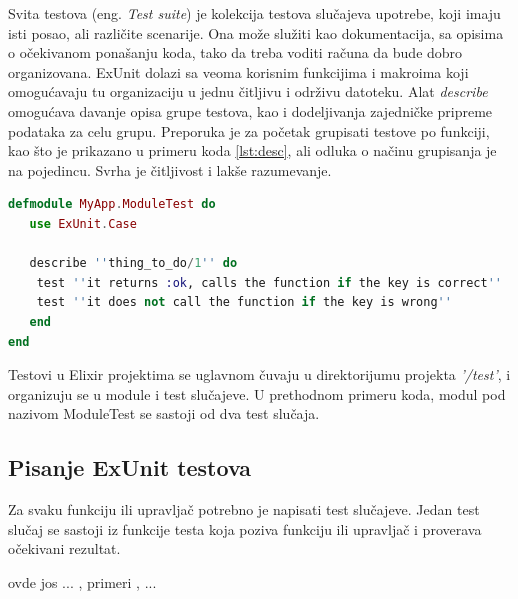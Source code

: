 \documentclass[12pt,oneside]{memoir}
\begin{document}
\par Svita testova (eng. \emph{Test suite}) je kolekcija testova slučajeva upotrebe, koji imaju isti posao, ali različite scenarije. Ona može služiti kao dokumentacija, sa opisima o očekivanom ponašanju koda, tako da treba voditi računa da bude dobro organizovana. ExUnit dolazi sa veoma korisnim funkcijima i makroima koji omogućavaju tu organizaciju u jednu čitljivu i održivu  datoteku. Alat \emph{describe } omogućava davanje opisa grupe testova, kao i dodeljivanja zajedničke pripreme podataka za celu grupu. Preporuka je za početak grupisati testove po funkciji, kao što je prikazano u primeru koda \ref{lst:desc}, ali odluka o načinu grupisanja je na pojedincu. Svrha je čitljivost i lakše razumevanje. 

\begin{lstlisting}[language=elixir, caption={Opisivanje testova unutar jedne grupe},captionpos=b, label={lst:desc}]
defmodule MyApp.ModuleTest do 
   use ExUnit.Case 
   
   describe ''thing_to_do/1'' do
   	test ''it returns :ok, calls the function if the key is correct''
   	test ''it does not call the function if the key is wrong''
   end
end
\end{lstlisting}

\par Testovi u Elixir projektima se uglavnom čuvaju u direktorijumu projekta \textit{'/test'}, i organizuju se u module i test slučajeve. U prethodnom primeru koda, modul pod nazivom ModuleTest se sastoji od dva test slučaja. 

\subsection{Pisanje ExUnit testova}
\par Za svaku funkciju ili upravljač potrebno je napisati test slučajeve. Jedan test slučaj se sastoji iz funkcije testa koja poziva funkciju ili upravljač i proverava očekivani rezultat.  



\par ovde jos ... , primeri , ... 
\end{document}

